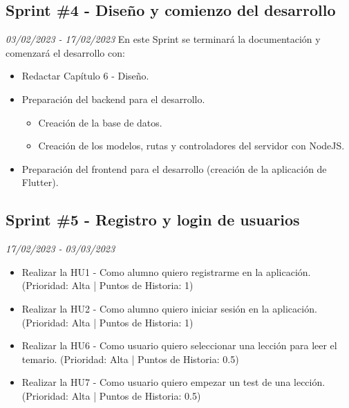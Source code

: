 \subsection{Sprint \#4 - Diseño y comienzo del desarrollo}
\textit{03/02/2023   -   17/02/2023}
En este Sprint se terminará la documentación y comenzará el desarrollo con:
\begin{itemize}
    \item Redactar Capítulo 6 - Diseño.
    \item Preparación del backend para el desarrollo.
    \begin{itemize}
        \item Creación de la base de datos.
        \item Creación de los modelos, rutas y controladores del servidor con NodeJS.
    \end{itemize}
    \item Preparación del frontend para el desarrollo (creación de la aplicación de Flutter).
\end{itemize}
\subsection{Sprint \#5 - Registro y login de usuarios}
\textit{17/02/2023   -   03/03/2023}
\begin{itemize}
    \item Realizar la HU1 - Como alumno quiero registrarme en la aplicación. (Prioridad: Alta | Puntos de Historia: 1)
    \item Realizar la HU2 - Como alumno quiero iniciar sesión en la aplicación. (Prioridad: Alta | Puntos de Historia: 1)
    \item Realizar la HU6 - Como usuario quiero seleccionar una lección para leer el temario. (Prioridad: Alta | Puntos de Historia: 0.5)
    \item Realizar la HU7 - Como usuario quiero empezar un test de una lección. (Prioridad: Alta | Puntos de Historia: 0.5)
\end{itemize}


